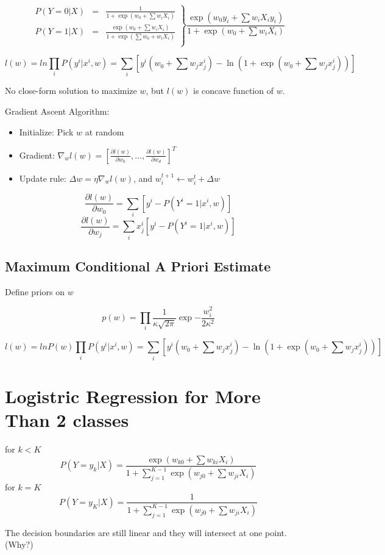 \documentclass[letterpaper,10pt]{article}
\begin{document}
\begin{equation}
\left.
\begin{array}{rcl}
P(Y=0|X) & = & \frac{1}{1+\exp(w_0+\sum{w_iX_i})} \\
P(Y=1|X) & = & \frac{\exp(w_0+\sum{w_iX_i})}{1+\exp(\sum{w_0+w_iX_i})} \\
\end{array}
\right\} \frac{\exp(w_0y_i+\sum{w_iX_iy_i})}{1+\exp(w_0+\sum{w_iX_i})}
\end{equation}

$$l(w) = ln\prod_i P(y^i|x^i,w) = \sum_i[y^i(w_0+\sum w_jx_j^i) - \ln (1+\exp(w_0+\sum w_jx_j^i))]$$

No close-form solution to maximize $w$, but $l(w)$ is concave function of $w$.

Gradient Ascent Algorithm:

\begin{itemize}
	\item Initialize: Pick $w$ at random
	\item Gradient: $\nabla_wl(w)= [\frac{\partial l(w)}{\partial w_0},\dots,\frac{\partial l(w)}{\partial w_d}]^T$
	\item Update rule: $\Delta w = \eta \nabla_wl(w)$, and $w_i^{t+1}\leftarrow w_i^t+\Delta w$
\end{itemize}

$$\frac{\partial l(w)}{\partial w_0}=\sum_i[y^i-P(Y^i=1|x^i,w)]$$
$$\frac{\partial l(w)}{\partial w_j}=\sum_ix^i_j[y^i-P(Y^i=1|x^i,w)]$$

\subsection{Maximum Conditional A Priori Estimate}

Define priors on $w$

$$p(w)= \prod_i \frac{1}{\kappa \sqrt{2\pi}}\exp{-\frac{w_i^2}{2\kappa^2}}$$

$$l(w) = lnP(w)\prod_i P(y^i|x^i,w) = \sum_i[y^i(w_0+\sum w_jx_j^i) - \ln (1+\exp(w_0+\sum w_jx_j^i))]$$

\section{Logistric Regression for More Than 2 classes}

for $k<K$
$$P(Y=y_k|X)=\frac{\exp(w_{k0}+\sum{w_{ki}X_i})}{1+\sum_{j=1}^{K-1}\exp(w_{j0}+\sum{w_{ji}X_i})}$$
for $k=K$
$$P(Y=y_K|X)=\frac{1}{1+\sum_{j=1}^{K-1}\exp(w_{j0}+\sum{w_{ji}X_i})}$$

The decision boundaries are still linear and they will intersect at one point. (Why?)
\end{document}
